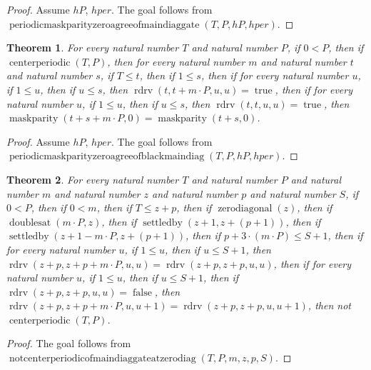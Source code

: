\documentclass[11pt]{article}
\newtheorem{theorem}{Theorem}[section]
\theoremstyle{definition}
\begin{document}
\begin{proof}
Assume \(hP\), \(hper\).
The goal follows from \(\operatorname{periodicmaskparityzeroagreeofmaindiaggate}(T, P, hP, hper)\).
\end{proof}
\begin{theorem}
\label{ll:paper:periodic-maskparity-zero-agree-of-black-main-diag}
For every natural number \(T\) and natural number \(P\), if \(0 < P\), then if \(\operatorname{centerperiodic}(T, P)\), then for every natural number \(m\) and natural number \(t\) and natural number \(s\), if \(T \le t\), then if \(1 \le s\), then if for every natural number \(u\), if \(1 \le u\), then if \(u \le s\), then \(\operatorname{rdrv}(t, t + m \cdot P, u, u) = \operatorname{true}\), then if for every natural number \(u\), if \(1 \le u\), then if \(u \le s\), then \(\operatorname{rdrv}(t, t, u, u) = \operatorname{true}\), then \(\operatorname{maskparity}(t + s + m \cdot P, 0) = \operatorname{maskparity}(t + s, 0)\).
\end{theorem}
\begin{proof}
Assume \(hP\), \(hper\).
The goal follows from \(\operatorname{periodicmaskparityzeroagreeofblackmaindiag}(T, P, hP, hper)\).
\end{proof}
\begin{theorem}
\label{ll:paper:not-centerperiodic-of-main-diag-gate-at-zero-diag}
For every natural number \(T\) and natural number \(P\) and natural number \(m\) and natural number \(z\) and natural number \(p\) and natural number \(S\), if \(0 < P\), then if \(0 < m\), then if \(T \le z + p\), then if \(\operatorname{zerodiagonal}(z)\), then if \(\operatorname{doublesat}(m \cdot P, z)\), then if \(\operatorname{settledby}(z + 1, z + (p + 1))\), then if \(\operatorname{settledby}(z + 1 - m \cdot P, z + (p + 1))\), then if \(p + 3 \cdot (m \cdot P) \le S + 1\), then if for every natural number \(u\), if \(1 \le u\), then if \(u \le S + 1\), then \(\operatorname{rdrv}(z + p, z + p + m \cdot P, u, u) = \operatorname{rdrv}(z + p, z + p, u, u)\), then if for every natural number \(u\), if \(1 \le u\), then if \(u \le S + 1\), then if \(\operatorname{rdrv}(z + p, z + p, u, u) = \operatorname{false}\), then \(\operatorname{rdrv}(z + p, z + p + m \cdot P, u, u + 1) = \operatorname{rdrv}(z + p, z + p, u, u + 1)\), then not \(\operatorname{centerperiodic}(T, P)\).
\end{theorem}
\begin{proof}
The goal follows from \(\operatorname{notcenterperiodicofmaindiaggateatzerodiag}(T, P, m, z, p, S)\).
\end{proof}
\end{document}
